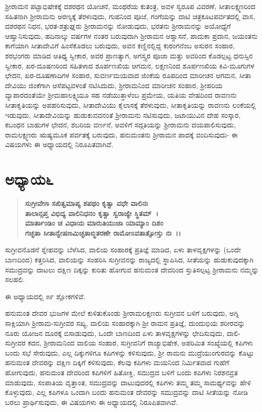ಶ‍್ರೀರಾಮನ ಪಟ್ಟಾಭಿಷೇಕಕ್ಕೆ ದಶರಥನ ಯೋಚನೆ, ಮಂಥರೆಯ ಕುತಂತ್ರ, ಅವಳ ಸ್ವರೂಪ ವಿವರಣೆ, ಸೀತಾಲಕ್ಷ್ಮಣರಿಂದ ಸಹಿತನಾಗಿ ಶ‍್ರೀರಾಮನು ಅರಣ್ಯಕ್ಕೆ ತೆರಳುವುದು, ಗುಹನಿಂದ ಪೂಜೆ, ಗಂಗೆಯನ್ನು ದಾಟಿ ಚಿತ್ರಕೂಟಪರ್ವತದಲ್ಲಿ ವಾಸ, ದಶರಥನ ನಿಧನ, ಭರತ-ಶತ್ರುಘ್ನರು ಶ‍್ರೀರಾಮನನ್ನು ನೋಡುವುದು, ಭರತನು ಶ‍್ರೀರಾಮನನ್ನು ಅಯೋಧ್ಯೆಗೆ ಆಹ್ವಾನಿಸುವುದು, ಹದಿನಾಲ್ಕು ವರ್ಷಗಳ ನಂತರ ಬರುವುದಾಗಿ ಶ‍್ರೀರಾಮನ ಆಶ್ವಾಸನೆ, ಪಾದುಕಾ ಪ್ರದಾನ, ಜಯಂತನು ಕಾಗೆಯಾಗಿ ಸೀತಾದೇವಿಗೆ ಹಿಂಸೆಕೊಡಲು ಬರುವುದು, ಅವನ ಕಣ್ಣಿನಲ್ಲಿದ್ದ ಕುರಂಗನೆಂಬ ಅಸುರನ ಸಂಹಾರ, ಶರಭಂಗರು ಮಾಡಿದ ಆತಿಥ್ಯ ಸ್ವೀಕಾರ, ಅವರ ಪ್ರಾಣತ್ಯಾಗ, ಅಗಸ್ತ್ಯರ ಪೂಜಾ ಮತ್ತು ಅವರಿಂದ ಕೊಡಲ್ಪಟ್ಟ ಧನುಸ್ಸಿನ ಸ್ವೀಕಾರ, ಖರ-ದೂಷಣರಿಂದ ಸಹಿತಳಾದ ಶೂರ್ಪಣಖಿಯ ಆಗಮನ, ಲಕ್ಷಣನಿಂದ ಶೂರ್ಪಣಖಿಯ ಕಿವಿ-ಮೂಗುಗಳ ಛೇದನ, ಖರ-ದೂಷಣಾದಿಗಳ ಸಂಹಾರ, ಸುವರ್ಣಮಯವಾದ ಜಿಂಕೆಯ ರೂಪದಿಂದ ಮಾರೀಚನ ಆಗಮನ, ಸೀತಾ ದೇವಿಯು ಜಿಂಕೆಗಾಗಿ ಆಸೆಪಟ್ಟವಳಂತೆ ನಟಿಸಿದುದು, ಶ‍್ರೀರಾಮನಿಂದ ಮಾರೀಚನ ಸಂಹಾರ, ಶ‍್ರೀಹರಿಯ ವ್ಯಾಪಾರದಂತೆಯೇ ಶ‍್ರೀಮಹಾಲಕ್ಷ್ಮಿಯೂ ಸಹ ನಡೆಯುತ್ತಾಳೆಂಬ ಪ್ರಮೇಯ, ಯತಿಯ ವೇಷದಿಂದ ರಾವಣನು ಸೀತಾಕೃತಿಯನ್ನು ಅಪಹರಿಸುವುದು, ಸೀತಾದೇವಿಯು ಕೈಲಾಸಕ್ಕೆ ತೆರಳುವುದು, ಸೀತಾಕೃತಿಯನ್ನು ರಾವಣನು ಲಂಕೆಯಲ್ಲಿ ಇಡುವುದು, ಸೀತಾದೇವಿಯನ್ನು ಹುಡುಕುವವನಂತೆ ಶ‍್ರೀರಾಮನು ನಟಿಸುವುದು, ಜಟಾಯುವಿನ ದೇಹ ಸಂಸ್ಕಾರ, ಕಬಂಧನ ಬಾಹುಗಳ ಛೇದನ, ಶಬರಿಯ ವರ್ಣನೆ, ಅವಳಿಗೆ ಸದ್ಗತಿಯನ್ನು ಶ‍್ರೀರಾಮನು ದಯಪಾಲಿಸುವುದು, ರಾಮಲಕ್ಷ್ಮಣರು ಋಷ್ಯಮೂಕ ಪರ್ವತಕ್ಕೆ ಬರುವುದು, ಹನುಮಂತನು ಶ‍್ರೀರಾಮನ ಪಾದಕ್ಕೆ ವಂದಿಸುವುದು- ಈ ವಿಷಯಗಳು ಈ ಅಧ್ಯಾಯದಲ್ಲಿ ನಿರೂಪಿತವಾಗಿವೆ.


\section*{ಅಧ್ಯಾಯ\enginline{-}೬}

\begin{verse}
\textbf{ಸುಗ್ರೀವೇಣ ಸಖಿತ್ವಮಾಪ್ಯ ಶಪಥಂ ಕೃತ್ವಾ ವಧೇ ವಾಲಿನಃ}\\\textbf{ತಾಲಾನ್ಸಪ್ತ ವಿಭಿದ್ಯ ವಾಲಿನಿಧನಂ ಕೃತ್ವಾ ಸ್ವರಾಜ್ಯೇ ಸ್ಥಿತಮ್~।}\\\textbf{ಮಾರ್ತಾಂಡಿಂ ಚ ವಿಧಾಯ ಮಾರುತಿಯುಜಾ ಯಾಮ್ಯಾಂ ದಿಶಂ}\\\textbf{ಗಚ್ಛತಾ ಸೀತಾನ್ವೇಷಣಮಿಚ್ಛತಾಬ್ಧಿತರಣೇ ರಾಮೋಽವತಾತ್ಸೋಸ್ತು ನಃ~।।}
\end{verse}

ಸುಗ್ರೀವನೊಡನೆ ಸ್ನೇಹವನ್ನು ಬೆಳೆಸಿದ, ವಾಲಿಯ ಸಂಹಾರಕ್ಕೆ ಪ್ರತಿಜ್ಞೆ ಮಾಡಿದ, ಏಳು ತಾಳವೃಕ್ಷಗಳನ್ನು (ಒಂದೇ ಬಾಣದಿಂದ) ಕತ್ತರಿಸಿದ, ವಾಲಿಯನ್ನು ಸಂಹರಿಸಿ ಸುಗ್ರೀವನನ್ನು ರಾಜ್ಯದಲ್ಲಿ ಸ್ಥಾಪಿಸಿದ, ಸೀತೆಯನ್ನು ಹುಡುಕುವುದಕ್ಕಾಗಿ ಸಮುದ್ರವನ್ನು ದಾಟಲು ದಕ್ಷಿಣ ದಿಕ್ಕನ್ನು ಕುರಿತು ಹೋಗುವ ಹನುಮಂತ ದೇವರಿಂದ ಸ್ತುತಿಸಲ್ಪಟ್ಟ ಶ‍್ರೀರಾಮನು ನಮ್ಮನ್ನು ಸಲಹಲಿ.

ಈ ಅಧ್ಯಾಯದಲ್ಲಿ ೫೯ ಶ್ಲೋಕಗಳಿವೆ.

ಹನುಮಂತ ದೇವರ ಭುಜಗಳ ಮೇಲೆ ಕುಳಿತುಕೊಂಡು ಶ‍್ರೀರಾಮಲಕ್ಷಣರು ಸುಗ್ರೀವನ ಬಳಿಗೆ ಬರುವುದು, ಅಗ್ನಿ ಸಾಕ್ಷಿಯಾಗಿ ಶ‍್ರೀರಾಮ-ಸುಗ್ರೀವರ ಸಖ್ಯ, ವಾಲಿಯ ಸಂಹಾರಕ್ಕಾಗಿ ಶ‍್ರೀ ರಾಮನ ಪ್ರತಿಜ್ಞೆ, ದುಂದುಭಿಯ ಶರೀರವನ್ನು ನೂರು ಯೋಜನ ದೂರಕ್ಕೆ ಬಿಸಾಡುವುದು, ಒಂದೇ ಬಾಣದಿಂದ ಏಳು ತಾಳವೃಕ್ಷಗಳನ್ನು ಛೇದಿಸುವುದು, ವಾಲಿ-ಸುಗ್ರೀವರ ಕದನ, ಶ‍್ರೀರಾಮನಿಂದ ವಾಲಿಯ ಸಂಹಾರ, ಸುಗ್ರೀವನಿಗೆ ರಾಜ್ಯಾಭಿಷೇಕ, ಅಪರಿಮಿತ ಸಂಖ್ಯೆಯಲ್ಲಿ ಕಪಿಗಳು ಬಂದು ಸಭೆ ಸೇರುವುದು, ಎಲ್ಲ ದಿಕ್ಕುಗಳಿಗೂ ಕಪಿಗಳನ್ನು ಕಳಿಸುವುದು, ಶ‍್ರೀ ರಾಮನು ಮುದ್ರೆಯುಂಗುರವನ್ನು ಕೊಟ್ಟು ಹನುಮಂತ ದೇವರನ್ನು ದಕ್ಷಿಣ ದಿಕ್ಕಿಗೆ ಕಳಿಸುವುದು, ಕೆಲವು ಕಪಿಗಳು ಮಯನಿಂದ ನಿರ್ಮಿತವಾದ ಗುಹೆಗೆ ಹೋಗುವುದು, ಹನುಮಂತ ದೇವರಿಂದ ಕಪಿಗಳಿಗೆ ಹಿತೋಕ್ತಿ, ಸಮುದ್ರದ ಬಳಿಗೆ ಬಂದು ಕಪಿಗಳು ನಿರಶನವ್ರತ ಮಾಡುವುದು, ಸಂಪಾತಿಯ ವೃತ್ತಾಂತ, ಸಮುದ್ರವನ್ನು ದಾಟುವುದರಲ್ಲಿ ಕಪಿಗಳು ತಮ್ಮ ತಮ್ಮ ಸಾಮರ್ಥ್ಯವನ್ನು ಹೇಳಿ ಕೊಳ್ಳುವುದು, ಎಲ್ಲ ಕಪಿಗಳೂ ಒಂದಾಗಿ ಬಂದು ಹನುಮಂತ ದೇವರನ್ನು ಸಮುದ್ರವನ್ನು ದಾಟಿ ಸೀತೆಯನ್ನು ನೋಡಿ ಬರಲು ಪ್ರಾರ್ಥಿಸುವುದು, ಈ ವಿಷಯಗಳು ಈ ಅಧ್ಯಾಯದಲ್ಲಿ ನಿರೂಪಿತವಾಗಿವೆ.


